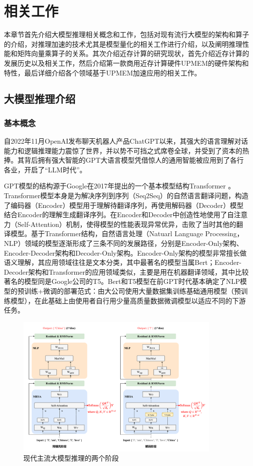 \chapter{相关工作}

本章节首先介绍大模型推理相关概念和工作，包括对现有流行大模型的架构和算子的介绍，对推理加速的技术尤其是模型量化的相关工作进行介绍，以及阐明推理性能和矩阵向量乘算子的关系。其次介绍近存计算的研究现状，首先介绍近存计算的发展历史以及相关工作，然后介绍第一款商用近存计算硬件UPMEM的硬件架构和特性，最后详细介绍各个领域基于UPMEM加速应用的相关工作。

\section{大模型推理介绍}

\subsection{基本概念}
自2022年11月OpenAI发布聊天机器人产品ChatGPT以来，其强大的语言理解对话能力和逻辑推理能力震惊了世界，并以势不可挡之式席卷全球，并受到了资本的热捧。其背后拥有强大智能的GPT大语言模型凭借惊人的通用智能被应用到了各行各业，开启了“LLM时代”。

GPT模型的结构源于Google在2017年提出的一个基本模型结构Transformer \cite{Transformer}。Transformer模型本身是为解决序列到序列（Seq2Seq）的自然语言翻译问题，构造了编码器（Encoder）模型用于理解待翻译序列，再使用解码器（Decoder）模型结合Encoder的理解生成翻译序列。在Encoder和Decoder中创造性地使用了自注意力（Self-Attention）机制，使得模型的性能表现异常优异，击败了当时其他的翻译模型。基于Transformer结构，自然语言处理（Natuarl Language Processing，NLP）领域的模型逐渐形成了三条不同的发展路径，分别是Encoder-Only架构、Encoder-Decoder架构和Decoder-Only架构。Encoder-Only架构的模型非常擅长做语义理解，其应用领域往往是文本分类，其中最著名的模型当属Bert\cite{Bert}；Encoder-Decoder架构和Transformer的应用领域类似，主要是用在机器翻译领域，其中比较著名的模型同是Google公司的T5\cite{T5}。Bert和T5模型在前GPT时代基本确定了NLP模型的预训练+微调的部署范式：由大公司使用大量数据集训练基础通用模型（预训练模型），在此基础上由使用者自行用少量高质量数据微调模型以适应不同的下游任务。

\begin{figure}[!htbp]
	\centering
    \includegraphics[width=0.9\textwidth]{figures/Infer.pdf}
	\caption{现代主流大模型推理的两个阶段}
    \label{LLMInfer}
\end{figure}

